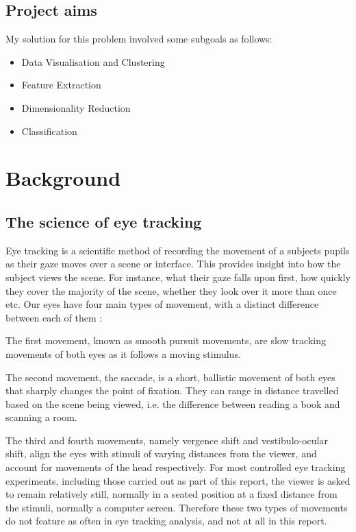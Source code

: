 \documentclass{report}
\begin{document}
{		\section{Project aims}
			My solution for this problem involved some subgoals as follows:
			\begin{itemize}
				\item Data Visualisation and Clustering
				\item Feature Extraction
				\item Dimensionality Reduction
				\item Classification
			\end{itemize}
	\newpage		
	\chapter{Background}
		\section{The science of eye tracking}
		Eye tracking is a scientific method of recording the movement of a subjects pupils as their gaze moves over a scene or interface. This provides insight into how the subject views the scene. For instance, what their gaze falls upon first, how quickly they cover the majority of the scene, whether they look over it more than once etc. Our eyes have four main types of movement, with a distinct difference between each of them \cite{eyemovements}:
		
		The first movement, known as smooth pursuit movements, are slow tracking movements of both eyes as it follows a moving stimulus.
		
		The second movement, the saccade, is a short, ballistic movement of both eyes that sharply changes the point of fixation. They can range in distance travelled based on the scene being viewed, i.e. the difference between reading a book and scanning a room.
		
		The third and fourth movements, namely vergence shift and vestibulo-ocular shift, align the eyes with stimuli of varying distances from the viewer, and account for movements of the head respectively. For most controlled eye tracking experiments, including those carried out as part of this report, the viewer is asked to remain relatively still, normally in a seated position at a fixed distance from the stimuli, normally a computer screen. Therefore these two types of movements do not feature as often in eye tracking analysis, and not at all in this report.
		
}
\end{document}
